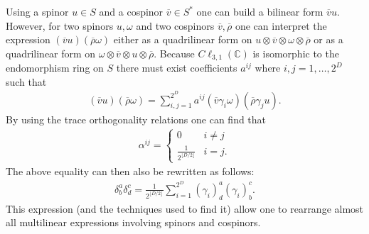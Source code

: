     Using a spinor $u\in S$ and a cospinor $\overline{v}\in S^*$ one can build a bilinear form $\overline{v}u$. However, for two spinors $u, \omega$ and two cospinors $\overline{v}, \overline{\rho}$ one can interpret the expression $(\overline{v}u)(\overline{\rho}\omega)$ either as a quadrilinear form on $u\otimes\overline{v}\otimes\omega\otimes\overline{\rho}$ or as a quadrilinear form on $\omega\otimes\overline{v}\otimes u\otimes\overline{\rho}$. Because $C\ell_{3, 1}(\mathbb{C})$ is isomorphic to the endomorphism ring on $S$ there must exist coefficients $a^{ij}$ where $i,j=1,\ldots,2^D$ such that
    \begin{gather}
        (\overline{v}u)(\overline{\rho}\omega) = \sum_{i,j=1}^{2^D}a^{ij}(\overline{v}\gamma_i\omega)(\overline{\rho}\gamma_ju).
    \end{gather}
    By using the trace orthogonality relations one can find that
    \begin{gather}
        \alpha^{ij} =
        \begin{cases}
            0&i\neq j\\
            \frac{1}{2^{\lfloor D/2 \rfloor}}&i=j.
        \end{cases}
    \end{gather}
    The above equality can then also be rewritten as follows:
    \begin{gather}
        \delta_b^a\delta_d^c = \frac{1}{2^{\lfloor D/2 \rfloor}}\sum_{i=1}^{2^D}(\gamma_i)_d^a(\gamma_i)_b^c.
    \end{gather}
    This expression (and the techniques used to find it) allow one to rearrange almost all multilinear expressions involving spinors and cospinors.